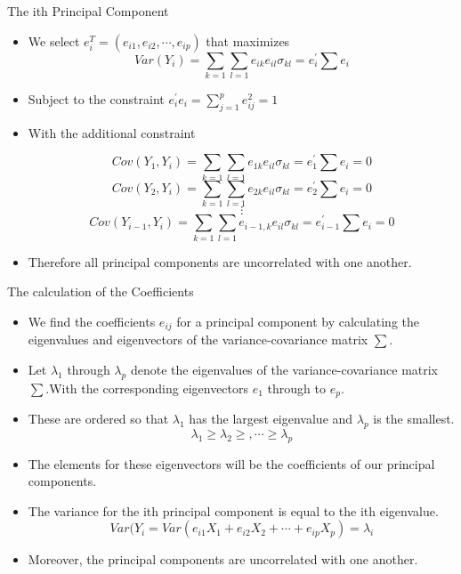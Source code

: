 \documentclass[10pt]{beamer}
\begin{document}
\begin{frame}{The ith Principal Component}
\begin{itemize}
 
\item We select $e_{i}^{T}=(e_{i1},e_{i2},\cdots,e_{ip})$ that maximizes 
$$ Var(Y_{i})=\sum_{k=1} \sum_{l=1} e_{ik}e_{il}\sigma_{kl}=e_{i}^{'}\sum e_{i}$$ 
\item Subject to the constraint $e_{i}^{'}e_{i}=\sum_{j=1}^{p}e_{ij}^{2}=1$
\item With the additional constraint 
\begin{center}
$$ Cov(Y_{1},Y_{i})=\sum_{k=1} \sum_{l=1} e_{1k}e_{il}\sigma_{kl}=e_{1}^{'}\sum e_{i}=0$$
$$ Cov(Y_{2},Y_{i})=\sum_{k=1} \sum_{l=1} e_{2k}e_{il}\sigma_{kl}=e_{2}^{'}\sum e_{i}=0$$
$$\vdots$$
$$ Cov(Y_{i-1},Y_{i})=\sum_{k=1} \sum_{l=1} e_{i-1,k}e_{il}\sigma_{kl}=e_{i-1}^{'}\sum e_{i}=0$$
\end{center}
\item Therefore all principal components are uncorrelated with one another.

\end{itemize}
\end{frame}

\begin{frame}{The calculation of the Coefficients}
\begin{itemize}
\item  We find the coefficients $e_{ij}$ for a principal component by calculating the  eigenvalues and eigenvectors of the variance-covariance matrix $\sum$.
\item  Let $\lambda_{1}$ through $\lambda_{p}$ denote the eigenvalues of the variance-covariance matrix $\sum$.With the corresponding eigenvectors $e_{1}$ through to $e_{p}$. 
\item These are ordered so that $\lambda_{1}$ has the largest eigenvalue and $\lambda_{p}$ is the smallest.
$$\lambda_{1} \geq \lambda_{2}\geq, \cdots \geq \lambda_{p}$$
\item The elements for these eigenvectors will be the coefficients of our principal components.
\item The variance for the ith principal component is equal to the ith eigenvalue. 
$$Var(Y_{i}=Var(e_{i1}X_{1}+e_{i2}X_{2}+\cdots+e_{ip}X_{p})=\lambda_{i}$$
\item Moreover, the principal components are uncorrelated with one another.
\end{itemize}
\end{frame}
\end{document}
